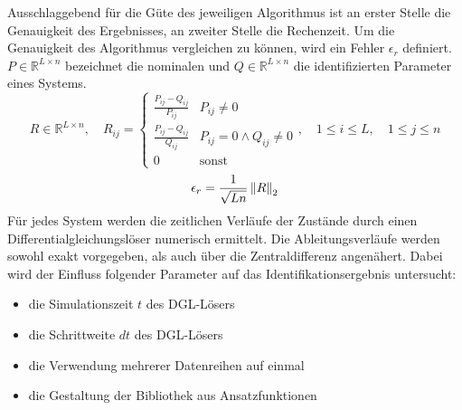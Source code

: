 Ausschlaggebend für die Güte des jeweiligen Algorithmus ist an erster Stelle die Genauigkeit des Ergebnisses, an zweiter Stelle die Rechenzeit. Um die Genauigkeit des Algorithmus vergleichen zu können, wird ein Fehler $\epsilon_r$  definiert. $P\in\mathbb{R}^{L\times n}$ bezeichnet die nominalen und $Q\in\mathbb{R}^{L\times n}$ die identifizierten Parameter eines Systems.
\begin{equation}
R \in\mathbb{R}^{L\times n} , \quad R_{ij}= \begin{cases}
\frac{P_{ij}-Q_{ij}}{P_{ij}} & P_{ij} \neq 0\\
\frac{P_{ij}-Q_{ij}}{Q_{ij}} & P_{ij} = 0 \wedge Q_{ij} \neq 0\\
0 & \text{sonst}
\end{cases}, \quad  1 \leq i \leq L, \quad 1\leq j \leq n
\end{equation}
\begin{equation}
\epsilon_r = \frac{1}{\sqrt{Ln}}\left\|R\right\|_2
\end{equation} 
Für jedes System werden die zeitlichen Verläufe der Zustände durch einen Differentialgleichungslöser numerisch %
ermittelt. Die Ableitungsverläufe werden sowohl exakt vorgegeben, als auch über die Zentraldifferenz angenähert. Dabei wird der Einfluss folgender Parameter auf das Identifikationsergebnis untersucht:
\begin{itemize}
\item die Simulationszeit $t$ des DGL-Lösers
\item die Schrittweite $dt$ des DGL-Lösers
\item die Verwendung mehrerer Datenreihen auf einmal 
\item die Gestaltung der Bibliothek aus Ansatzfunktionen
\end{itemize}





